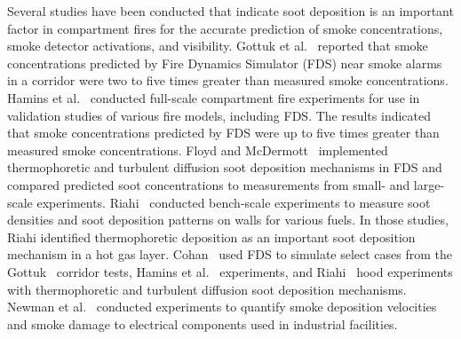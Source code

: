 Several studies have been conducted that indicate soot deposition is an important factor in compartment fires for the accurate prediction of smoke concentrations, smoke detector activations, and visibility. Gottuk et al.~\cite{Gottuk:IAFSS2008} reported that smoke concentrations predicted by Fire Dynamics Simulator (FDS) near smoke alarms in a corridor were two to five times greater than measured smoke concentrations. Hamins et al.~\cite{Hamins:SP1013-1} conducted full-scale compartment fire experiments for use in validation studies of various fire models, including FDS. The results indicated that smoke concentrations predicted by FDS were up to five times greater than measured smoke concentrations. Floyd and McDermott~\cite{Floyd:Interflam2010} implemented thermophoretic and turbulent diffusion soot deposition mechanisms in FDS and compared predicted soot concentrations to measurements from small- and large-scale experiments. Riahi~\cite{riahi2013wall} conducted bench-scale experiments to measure soot densities and soot deposition patterns on walls for various fuels. In those studies, Riahi identified thermophoretic deposition as an important soot deposition mechanism in a hot gas layer. Cohan~\cite{Cohan:Masters} used FDS to simulate select cases from the Gottuk~\cite{Gottuk:IAFSS2008} corridor tests, Hamins et al.~\cite{Hamins:SP1013-1} experiments, and Riahi~\cite{riahi2013wall} hood experiments with thermophoretic and turbulent diffusion soot deposition mechanisms. Newman et al.~\cite{newmansmoke} conducted experiments to quantify smoke deposition velocities and smoke damage to electrical components used in industrial facilities.

